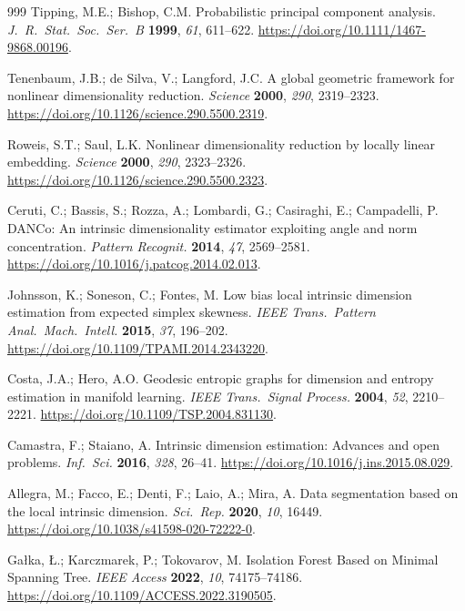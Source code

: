 \documentclass[11pt,a4paper]{ltjsarticle}
\begin{document}
\begin{thebibliography}{999}
Tipping, M.E.; Bishop, C.M.
Probabilistic principal component analysis.
\textit{J.\ R.\ Stat.\ Soc.\ Ser.\ B} \textbf{1999}, \textit{61}, 611--622.
\url{https://doi.org/10.1111/1467-9868.00196}.

Tenenbaum, J.B.; de Silva, V.; Langford, J.C.
A global geometric framework for nonlinear dimensionality reduction.
\textit{Science} \textbf{2000}, \textit{290}, 2319--2323.
\url{https://doi.org/10.1126/science.290.5500.2319}.

Roweis, S.T.; Saul, L.K.
Nonlinear dimensionality reduction by locally linear embedding.
\textit{Science} \textbf{2000}, \textit{290}, 2323--2326.
\url{https://doi.org/10.1126/science.290.5500.2323}.

Ceruti, C.; Bassis, S.; Rozza, A.; Lombardi, G.; Casiraghi, E.;
Campadelli, P.
DANCo: An intrinsic dimensionality estimator exploiting angle and norm
concentration.
\textit{Pattern Recognit.} \textbf{2014}, \textit{47}, 2569--2581.
\url{https://doi.org/10.1016/j.patcog.2014.02.013}.

Johnsson, K.; Soneson, C.; Fontes, M.
Low bias local intrinsic dimension estimation from expected simplex
skewness.
\textit{IEEE Trans.\ Pattern Anal.\ Mach.\ Intell.} \textbf{2015},
\textit{37}, 196--202. \url{https://doi.org/10.1109/TPAMI.2014.2343220}.

Costa, J.A.; Hero, A.O.
Geodesic entropic graphs for dimension and entropy estimation in manifold
learning.
\textit{IEEE Trans.\ Signal Process.} \textbf{2004}, \textit{52},
2210--2221. \url{https://doi.org/10.1109/TSP.2004.831130}.

Camastra, F.; Staiano, A.
Intrinsic dimension estimation: Advances and open problems.
\textit{Inf.\ Sci.} \textbf{2016}, \textit{328}, 26--41.
\url{https://doi.org/10.1016/j.ins.2015.08.029}.

Allegra, M.; Facco, E.; Denti, F.; Laio, A.; Mira, A.
Data segmentation based on the local intrinsic dimension.
\textit{Sci.\ Rep.} \textbf{2020}, \textit{10}, 16449.
\url{https://doi.org/10.1038/s41598-020-72222-0}.

Ga{\l}ka, {\L}.; Karczmarek, P.; Tokovarov, M.
Isolation Forest Based on Minimal Spanning Tree.
\textit{IEEE Access} \textbf{2022}, \textit{10}, 74175--74186.
\url{https://doi.org/10.1109/ACCESS.2022.3190505}.


\end{thebibliography}
\end{document}
